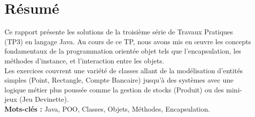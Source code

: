
\chapter*{Résumé}

\begin{center}
{\large
Ce rapport présente les solutions de la troisi\`{e}me s\'{e}rie de Travaux Pratiques (TP3) en langage Java. Au cours de ce TP, nous avons mis en \oe{}uvre les concepts fondamentaux de la programmation orient\'{e}e objet tels que l'encapsulation, les m\'{e}thodes d'instance, et l'interaction entre les objets.\\[0.4cm]

Les exercices couvrent une vari\'{e}t\'{e} de classes allant de la mod\'{e}lisation d'entit\'{e}s simples (Point, Rectangle, Compte Bancaire) jusqu'\`{a} des syst\`{e}mes avec une logique m\'{e}tier plus pouss\'{e}e comme la gestion de stocks (Produit) ou des mini-jeux (Jeu Devinette).\\[0.4cm]

\textbf{Mots-clés :} Java, POO, Classes, Objets, M\'{e}thodes, Encapsulation.
\vfill
}
\end{center}

%
%
%
